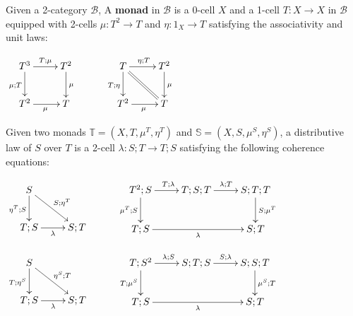 \begin{definition}
\label{def:monad}
%

Given a 2-category $\mathcal B$,  A {\bf monad} in $\mathcal B$ is a 0-cell $X$ and a 1-cell $T:X\to X$ in $\mathcal B$ equipped with 2-cells $\mu:T^2 \to T$ and $\eta:1_X\to T$ satisfying the associativity and unit laws:


\hfil$
\xymatrix{
T^3 \ar[r]^{T;\mu} \ar[d]_{\mu; T}
  & T^2 \ar[d]^\mu\\
T^2\ar[r]_{\mu} & T
}
\hspace*{1cm}
\xymatrix{
T \ar[r]^{\eta; T} \ar[d]_{ T;\eta} \ar@{=}[dr] & T^2 \ar[d]^\mu\\
T^2 \ar[r]_{\mu} & T
}
$

%
%
%
\end{definition}



\begin{definition}
Given two monads $\mathbb{T}=(X,T,\mu^T, \eta^T)$ and $\mathbb{S}=(X,S,\mu^S, \eta^S)$, a distributive law of $S$ over $T$ is a 2-cell $\lambda:S;T\to T;S$ satisfying the following coherence equations:


\hfil
$
\xymatrix{
S \ar[dr]^{S;\eta^T} \ar[d]_{\eta^T;S}\\
 T;S \ar[r]_{\lambda}
 & S;T
}
\hspace*{1cm}
\xymatrix{
T^2;S \ar[r]^{T;\lambda} \ar[d]_{\mu^T;S}
 & T;S;T \ar[r]^{\lambda;T}
  & S;T;T \ar[d]^{S;\mu^T}\\
T;S \ar[rr]_{\lambda}
  & 
  &S;T
}
$

\hfil
$
\xymatrix{
S \ar[dr]^{\eta^S;T} \ar[d]_{T;\eta^S}\\
 T;S \ar[r]_{\lambda}
 & S;T
}
\hspace*{1cm}
\xymatrix{
T;S^2 \ar[r]^{\lambda;S} \ar[d]_{T;\mu^S}
 & S;T;S \ar[r]^{S;\lambda}
  & S;S;T \ar[d]^{\mu^S;T}\\
T;S \ar[rr]_{\lambda}
  & 
  &S;T
}
$
\end{definition}


